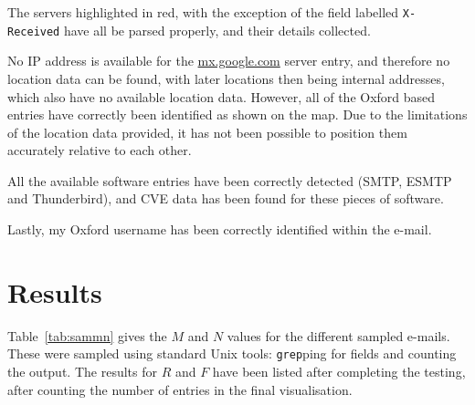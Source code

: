 

The servers highlighted in red, with the exception of the field labelled
\texttt{X-Received} have all be parsed properly, and their details collected.

No IP address is available for the \url{mx.google.com} server entry, and
therefore no location data can be found, with later locations then being
internal addresses, which also have no available location data.  However,
all of the Oxford based entries have correctly been identified as shown 
on the map.  Due to the limitations of the location data provided, it has 
not been possible to position them accurately relative to each other.

All the available software entries have been correctly detected (SMTP, ESMTP
and Thunderbird), and CVE data has been found for these pieces of software.

Lastly, my Oxford username has been correctly identified within the e-mail.

\section{Results}

Table~\ref{tab:sammn} gives the $M$ and $N$ values for the different sampled
e-mails.  These were sampled using standard Unix tools: \texttt{grep}ping for
fields and counting the output. The results for $R$ and $F$ have been listed
after completing the testing, after counting the number of entries in the final
visualisation.


